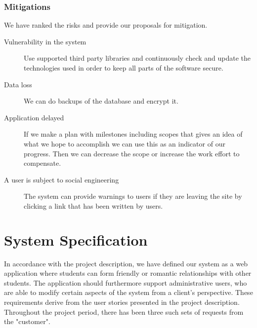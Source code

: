 \documentclass[a4paper]{article}
\begin{document}
\subsubsection{Mitigations}
We have ranked the risks and provide our proposals for mitigation.
\begin{description}
\item[Vulnerability in the system]
Use supported third party libraries and continuously check and update the technologies used in order to keep all parts of the software secure.



\item[Data loss]
We can do backups of the database and encrypt it.

\item[Application delayed]
If we make a plan with milestones including scopes that gives an idea of what we hope to accomplish we can use this as an indicator of our progress.
Then we can decrease the scope or increase the work effort to compensate.

\item[A user is subject to social engineering]
The system can provide warnings to users if they are leaving the site by clicking a link that has been written by users.

\end{description}


\section{System Specification}
In accordance with the project description, we have defined our system as a web application where students can form friendly or romantic relationships with other students. The application should furthermore support administrative users, who are able to modify certain aspects of the system from a client's perspective. These requirements derive from the user stories presented in the project description. Throughout the project period, there has been three such sets of requests from the "customer".
\end{document}

